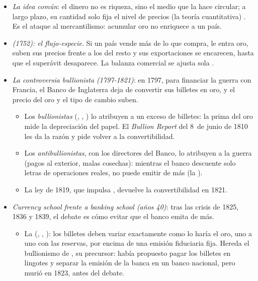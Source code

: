 \documentclass[11pt]{article}
\begin{document}
\begin{itemize}
\item \emph{La idea común}: el dinero no es riqueza, sino el medio que la hace circular; a largo plazo, su cantidad solo fija el nivel de precios (la teoría cuantitativa) . Es el ataque al mercantilismo: acumular oro no enriquece a un país.
\item \emph{ (1752): el flujo-especie}. Si un país vende más de lo que compra, le entra oro, suben sus precios frente a los del resto y sus exportaciones se encarecen, hasta que el superávit desaparece\nocite{Hume1752Money,Hume1752Balance}. La balanza comercial se ajusta sola .
\item \emph{La controversia bullionista (1797-1821)}: en 1797, para financiar la guerra con Francia, el Banco de Inglaterra deja de convertir sus billetes en oro, y el precio del oro y el tipo de cambio suben\nocite{HET2026Bullion}.
  \begin{itemize}
  \item Los \emph{bullionistas} (, , ) lo atribuyen a un exceso de billetes: la prima del oro mide la depreciación del papel\nocite{Thornton1802Enquiry,Ricardo1810HighPrice}. El \emph{Bullion Report} del 8~de junio de 1810 les da la razón y pide volver a la convertibilidad\nocite{BullionReport1810}.
  \item Los \emph{antibullionistas}, con los directores del Banco, lo atribuyen a la guerra (pagos al exterior, malas cosechas): mientras el banco descuente solo letras de operaciones reales, no puede emitir de más (la ).
  \item La ley de 1819, que impulsa , devuelve la convertibilidad en 1821.
  \end{itemize}
\item \emph{Currency school frente a banking school (años 40)}: tras las crisis de 1825, 1836 y 1839, el debate es cómo evitar que el banco emita de más.
  \begin{itemize}
  \item La  (, , ): los billetes deben variar exactamente como lo haría el oro, uno a uno con las reservas, por encima de una emisión fiduciaria fija. Hereda el bullionismo de , su precursor: había propuesto pagar los billetes en lingotes\nocite{Ricardo1816Proposals} y separar la emisión de la banca en un banco nacional\nocite{Ricardo1824Plan}, pero murió en 1823, antes del debate.

\end{itemize}
\end{itemize}
\end{document}
